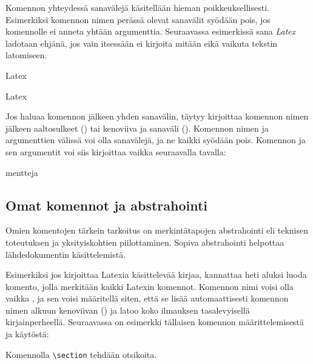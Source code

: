 Komennon yhteydessä sanavälejä käsitellään hieman poikkeuksellisesti.
Esimerkiksi komennon nimen perässä olevat sanavälit syödään pois, jos
komennolle ei anneta yhtään argumenttia. Seuraavassa esimerkissä sana
\emph{Latex} ladotaan ehjänä, jos vain  itsessään ei
kirjoita mitään eikä vaikuta tekstin latomiseen.

\begin{koodilohkosis}
La\komento   tex
\end{koodilohkosis}

\begin{tulossis}
  Latex
\end{tulossis}

Jos haluaa komennon jälkeen yhden sanavälin, täytyy kirjoittaa komennon
nimen jälkeen aaltosulkeet () tai kenoviiva ja
sanaväli (). Komennon nimen ja argumenttien
välissä voi olla sanavälejä, ja ne kaikki syödään pois. Komennon ja sen
argumentit voi siis kirjoittaa vaikka seuraavalla tavalla:

\begin{koodilohkosis}
   {mentteja}
\end{koodilohkosis}

\subsection{Omat komennot ja abstrahointi}

Omien komentojen tärkein tarkoitus on merkintätapojen abstrahointi eli
teknisen toteutuksen ja yksityiskohtien piilottaminen. Sopiva
abstrahointi helpottaa lähdedokumentin käsittelemistä.

Esimerkiksi jos kirjoittaa Latexia käsittelevää kirjaa, kannattaa heti
aluksi luoda komento, jolla merkitään kaikki Latexin komennot. Komennon
nimi voisi olla vaikka , ja sen voisi määritellä
siten, että se lisää automaattisesti komennon nimen alkuun kenoviivan
(\keno) ja latoo koko ilmauksen tasalevyisellä kirjainperheellä.
Seuraavassa on esimerkki tällaisen komennon määrittelemisestä ja
käytöstä:

\begin{koodilohkosis}
\newcommand{\komento}[1]{\texttt{\textbackslash #1}}

Komennolla \komento{section} tehdään otsikoita.
\end{koodilohkosis}

